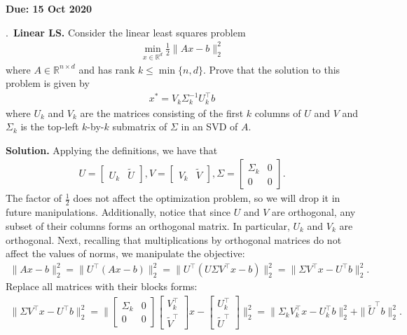 \documentclass{letter}
\newcounter{problem}
\newcounter{solution}
\newcommand{\Problem}[2]{%
	\stepcounter{problem}%
	\leftskip=0pt%
	\theproblem.~\textbf{{#1.}} #2 \par%
}
\newcommand{\Solution}[1]{%
	\textbf{Solution.} #1 \par%
}
\newcommand{\Due}[1]{\textbf{Due: #1} \par}
\newcommand{\T}{\intercal}
\newcommand{\R}{\mathbb{R}}
\begin{document}
    \Due{15 Oct 2020}

    \Problem{Linear LS}{Consider the linear least squares problem \begin{align*}
        \min_{x \in \R^d} \frac{1}{2}\|Ax - b\|^2_2
    \end{align*} where $A \in \R^{n\times d}$ and has rank $k \leq \min\{n,d\}$. Prove that the solution to this problem is given by \begin{align*}
        x^* = V_k\Sigma^{-1}_kU_k^\T b
    \end{align*} where $U_k$ and $V_k$ are the matrices consisting of the first $k$ columns of $U$ and $V$ and $\Sigma_k$ is the top-left $k$-by-$k$ submatrix of $\Sigma$ in an SVD of $A$.}
    \Solution{Applying the definitions, we have that \begin{align*}
        U = \begin{bmatrix} U_k & \tilde{U} \end{bmatrix}, V = \begin{bmatrix} V_k & \tilde{V} \end{bmatrix}, \Sigma = \begin{bmatrix} \Sigma_k & 0 \\ 0 & 0 \end{bmatrix}.
    \end{align*} The factor of $\frac{1}{2}$ does not affect the optimization problem, so we will drop it in future manipulations. Additionally, notice that since $U$ and $V$ are orthogonal, any subset of their columns forms an orthogonal matrix. In particular, $U_k$ and $V_k$ are orthogonal. Next, recalling that multiplications by orthogonal matrices do not affect the values of norms, we manipulate the objective: \begin{align*}
        \|Ax - b\|_2^2 = \|U^\T (Ax - b)\|_2^2 = \|U^\T (U\Sigma V^\T x - b)\|_2^2 =  \|\Sigma V^\T x - U^\T b \|_2^2.
    \end{align*} Replace all matrices with their blocks forms: \begin{align*}
        \|\Sigma V^\T x - U^\T b \|_2^2 = \Bigg\|\begin{bmatrix} \Sigma_k & 0 \\ 0 & 0 \end{bmatrix} \begin{bmatrix} V_k^\T \\ \tilde{V}^\T \end{bmatrix} x - \begin{bmatrix} U_k^\T \\ \tilde{U}^\T \end{bmatrix}\Bigg\|_2^2 = \|\Sigma_kV_k^\T x - U_k^\T b \|_2^2 + \|\tilde{U}^\T b\|_2^2.

\end{align*}}
\end{document}
